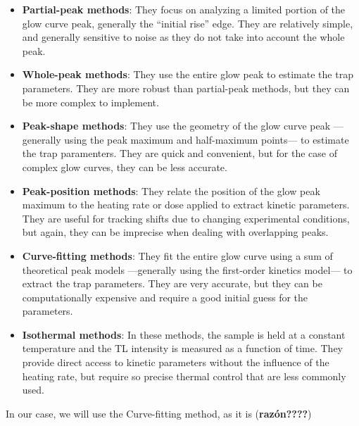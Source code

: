 \begin{itemize}
  \item \textbf{Partial-peak methods}: They focus on analyzing a limited portion of the glow curve peak, generally the ``initial rise'' edge. They are relatively simple, and generally sensitive to noise as they do not take into account the whole peak.
  \item \textbf{Whole-peak methods}: They use the entire glow peak to estimate the trap parameters. They are more robust than partial-peak methods, but they can be more complex to implement.
  \item \textbf{Peak-shape methods}: They use the geometry of the glow curve peak ---generally using the peak maximum and half-maximum points--- to estimate the trap paramenters. They are quick and convenient, but for the case of complex glow curves, they can be less accurate.
  \item \textbf{Peak-position methods}: They relate the position of the glow peak maximum to the heating rate or dose applied to extract kinetic parameters. They are useful for tracking shifts due to changing experimental conditions, but again, they can be imprecise when dealing with overlapping peaks.
  \item \textbf{Curve-fitting methods}: They fit the entire glow curve using a sum of theoretical peak models ---generally using the first-order kinetics model--- to extract the trap parameters. They are very accurate, but they can be computationally expensive and require a good initial guess for the parameters.
  \item \textbf{Isothermal methods}: In these methods, the sample is held at a constant temperature and the TL intensity is measured as a function of time. They provide direct access to kinetic parameters without the influence of the heating rate, but require so precise thermal control that are less commonly used.
\end{itemize}

In our case, we will use the Curve-fitting method, as it is (\textbf{razón????})